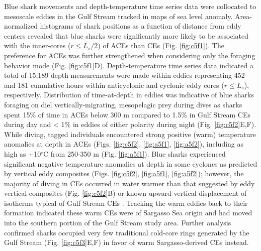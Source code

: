 Blue shark movements and depth-temperature time series data were collocated to mesoscale eddies in the Gulf Stream tracked in maps of sea level anomaly. Area-normalized histograms of shark positions as a function of distance from eddy centers revealed that blue sharks were significantly more likely to be associated with the inner-cores ($r \leq L_s / 2$) of ACEs than CEs (Fig. \ref{fig:c5f1}). The preference for ACEs was further strengthened when considering only the foraging behavior mode (Fig. \ref{fig:c5f1}D). Depth-temperature time series data indicated a total of 15,189 depth measurements were made within eddies representing 452 and 181 cumulative hours within anticyclonic and cyclonic eddy cores ($r \leq L_s$), respectively. Distribution of time-at-depth in eddies was indicative of blue sharks foraging on diel vertically-migrating, mesopelagic prey during dives as sharks spent 15\% of time in ACEs below 300 m compared to 1.5\% in Gulf Stream CEs during day and < 1\% in eddies of either polarity during night (Fig. \ref{fig:c5f2}E,F). While diving, tagged individuals encountered strong positive (warm) temperature anomalies at depth in ACEs (Figs. \ref{fig:c5f2}, \ref{fig:a5f1}, \ref{fig:a5f2}), including as high as +10$^\circ$C from 250-350 m (Fig. \ref{fig:a5f1}). Blue sharks experienced significant negative temperature anomalies at depth in some cyclones as predicted by vertical eddy composites (Figs. \ref{fig:c5f2}, \ref{fig:a5f1}, \ref{fig:a5f2}); however, the majority of diving in CEs occurred in water warmer than that suggested by eddy vertical composites (Fig. \ref{fig:c5f2}B) or known upward vertical displacement of isotherms typical of Gulf Stream CEs \citep[cold-core rings;][]{Gaube2014, Gaube2018}. Tracking the warm eddies back to their formation indicated these warm CEs were of Sargasso Sea origin and had moved into the southern portion of the Gulf Stream study area. Further analysis confirmed sharks occupied very few traditional cold-core rings generated by the Gulf Stream (Fig. \ref{fig:c5f3}E,F) in favor of warm Sargasso-derived CEs instead.


